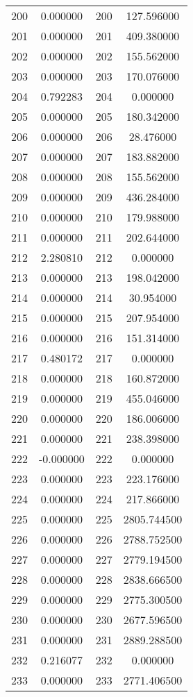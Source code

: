 \documentclass[12pt]{article}
\begin{document}
\begin{longtable}{@{}cccc@{}}
200 & 0.000000 & 200 & 127.596000 \\
201 & 0.000000 & 201 & 409.380000 \\
202 & 0.000000 & 202 & 155.562000 \\
203 & 0.000000 & 203 & 170.076000 \\
204 & 0.792283 & 204 & 0.000000 \\
205 & 0.000000 & 205 & 180.342000 \\
206 & 0.000000 & 206 & 28.476000 \\
207 & 0.000000 & 207 & 183.882000 \\
208 & 0.000000 & 208 & 155.562000 \\
209 & 0.000000 & 209 & 436.284000 \\
210 & 0.000000 & 210 & 179.988000 \\
211 & 0.000000 & 211 & 202.644000 \\
212 & 2.280810 & 212 & 0.000000 \\
213 & 0.000000 & 213 & 198.042000 \\
214 & 0.000000 & 214 & 30.954000 \\
215 & 0.000000 & 215 & 207.954000 \\
216 & 0.000000 & 216 & 151.314000 \\
217 & 0.480172 & 217 & 0.000000 \\
218 & 0.000000 & 218 & 160.872000 \\
219 & 0.000000 & 219 & 455.046000 \\
220 & 0.000000 & 220 & 186.006000 \\
221 & 0.000000 & 221 & 238.398000 \\
222 & -0.000000 & 222 & 0.000000 \\
223 & 0.000000 & 223 & 223.176000 \\
224 & 0.000000 & 224 & 217.866000 \\
225 & 0.000000 & 225 & 2805.744500 \\
226 & 0.000000 & 226 & 2788.752500 \\
227 & 0.000000 & 227 & 2779.194500 \\
228 & 0.000000 & 228 & 2838.666500 \\
229 & 0.000000 & 229 & 2775.300500 \\
230 & 0.000000 & 230 & 2677.596500 \\
231 & 0.000000 & 231 & 2889.288500 \\
232 & 0.216077 & 232 & 0.000000 \\
233 & 0.000000 & 233 & 2771.406500 \\

\end{longtable}
\end{document}
